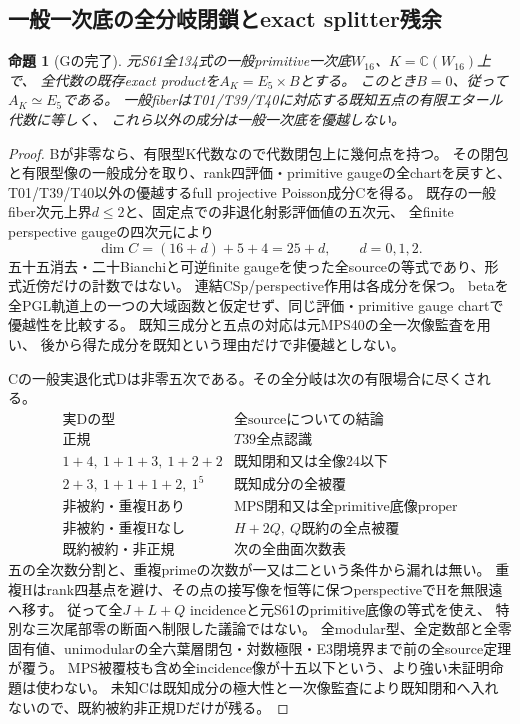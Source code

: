 \documentclass[a4paper,11pt]{ltjsarticle}
\newtheorem{proposition}{命題}[section]
\theoremstyle{definition}
\begin{document}
\subsection{一般一次底の全分岐閉鎖とexact splitter残余}
\begin{proposition}[Gの完了]\label{prop:global-g-exhaustion}
元S61全134式の一般primitive一次底$W_{16}$、$K=\mathbb C(W_{16})$上で、
全代数の既存exact productを$A_K=E_5\times B$とする。
このとき$B=0$、従って$A_K\simeq E_5$である。
一般fiberはT01/T39/T40に対応する既知五点の有限エタール代数に等しく、
これら以外の成分は一般一次底を優越しない。
\end{proposition}
\begin{proof}
Bが非零なら、有限型K代数なので代数閉包上に幾何点を持つ。
その閉包と有限型像の一般成分を取り、rank四評価・primitive gaugeの全chartを戻すと、
T01/T39/T40以外の優越するfull projective Poisson成分Cを得る。
既存の一般fiber次元上界$d\le2$と、固定点での非退化射影評価値の五次元、
全finite perspective gaugeの四次元により
\[
 \dim C=(16+d)+5+4=25+d,\qquad d=0,1,2.
\]
五十五消去・二十Bianchiと可逆finite gaugeを使った全sourceの等式であり、形式近傍だけの計数ではない。
連結CSp/perspective作用は各成分を保つ。
betaを全PGL軌道上の一つの大域函数と仮定せず、同じ評価・primitive gauge chartで優越性を比較する。
既知三成分と五点の対応は元MPS40の全一次像監査を用い、
後から得た成分を既知という理由だけで非優越としない。

Cの一般実退化式Dは非零五次である。その全分岐は次の有限場合に尽くされる。
\[
\begin{array}{c|l}
 \text{実Dの型}&\text{全sourceについての結論}\\\hline
 \text{正規}&T39\text{全点認識}\\
 1+4,\ 1+1+3,\ 1+2+2&\text{既知閉和又は全像24以下}\\
 2+3,\ 1+1+1+2,\ 1^5&\text{既知成分の全被覆}\\
 \text{非被約・重複Hあり}&\text{MPS閉和又は全primitive底像proper}\\
 \text{非被約・重複Hなし}&H+2Q,\ Q\text{既約の全点被覆}\\
 \text{既約被約・非正規}&\text{次の全曲面次数表}
\end{array}
\]
五の全次数分割と、重複primeの次数が一又は二という条件から漏れは無い。
重複Hはrank四基点を避け、その点の接写像を恒等に保つperspectiveでHを無限遠へ移す。
従って全$J+L+Q$ incidenceと元S61のprimitive底像の等式を使え、
特別な三次尾部零の断面へ制限した議論ではない。
全modular型、全定数部と全零固有値、unimodularの全六葉層閉包・対数極限・E3閉境界まで前の全source定理が覆う。
MPS被覆枝も含め全incidence像が十五以下という、より強い未証明命題は使わない。
未知Cは既知成分の極大性と一次像監査により既知閉和へ入れないので、既約被約非正規Dだけが残る。


\end{proof}
\end{document}
